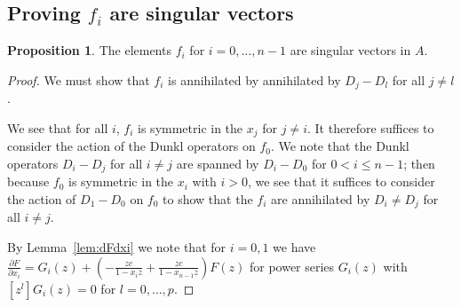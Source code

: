 \documentclass{amsart}
\numberwithin{equation}{section}
\theoremstyle{definition}
\newtheorem{proposition}[theorem]{Proposition}
\begin{document}
\subsection{Proving $f_i$ are singular vectors} 

\begin{proposition}\label{prop:ann} 
The elements $f_i$ for $i=0,\dots,n-1$ are singular vectors in $A$.
\end{proposition}
\begin{proof}
We must show that $f_i$ is annihilated by annihilated by $D_j-D_l$ for all $j \ne l$.

We see that for all $i$, $f_i$ is symmetric in the $x_j$ for $j \ne i$. It therefore suffices to consider the action of the Dunkl operators on $f_0$. We note that the Dunkl operators $D_i-D_j$ for all $i \ne j$ are spanned by $D_i-D_0$ for $0<i \le n-1$; then because $f_0$ is symmetric in the $x_i$ with $i > 0$, we see that it suffices to consider the action of $D_1-D_0$ on $f_0$ to show that the $f_i$ are annihilated by $D_i \ne D_j$ for all $i \ne j$. 

By Lemma~\ref{lem:dFdxi} we note that for $i=0,1$ we have $\frac{\partial F}{\partial x_i} = G_i(z)+\left(-\frac{zc}{1-x_iz}+\frac{zc}{1-x_{n-1}z}\right)F(z)$ for power series $G_i(z)$ with $[z^l]G_i(z)=0$ for $l=0,\dots,p$.


\end{proof}
\end{document}
